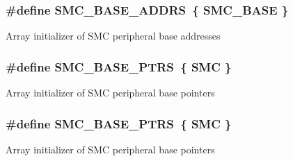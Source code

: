 \subsubsection[{\texorpdfstring{S\+M\+C\+\_\+\+B\+A\+S\+E\+\_\+\+A\+D\+D\+RS}{SMC_BASE_ADDRS}}]{\setlength{\rightskip}{0pt plus 5cm}\#define S\+M\+C\+\_\+\+B\+A\+S\+E\+\_\+\+A\+D\+D\+RS~\{ {\bf S\+M\+C\+\_\+\+B\+A\+SE} \}}\hypertarget{group__SMC__Peripheral__Access__Layer_ga1378b926401c2f7a44f4238a027ff8c2}{}\label{group__SMC__Peripheral__Access__Layer_ga1378b926401c2f7a44f4238a027ff8c2}
Array initializer of S\+MC peripheral base addresses 
\subsubsection[{\texorpdfstring{S\+M\+C\+\_\+\+B\+A\+S\+E\+\_\+\+P\+T\+RS}{SMC_BASE_PTRS}}]{\setlength{\rightskip}{0pt plus 5cm}\#define S\+M\+C\+\_\+\+B\+A\+S\+E\+\_\+\+P\+T\+RS~\{ {\bf S\+MC} \}}\hypertarget{group__SMC__Peripheral__Access__Layer_gae583f3f0917ee513adcac36dd042a5f3}{}\label{group__SMC__Peripheral__Access__Layer_gae583f3f0917ee513adcac36dd042a5f3}
Array initializer of S\+MC peripheral base pointers 
\subsubsection[{\texorpdfstring{S\+M\+C\+\_\+\+B\+A\+S\+E\+\_\+\+P\+T\+RS}{SMC_BASE_PTRS}}]{\setlength{\rightskip}{0pt plus 5cm}\#define S\+M\+C\+\_\+\+B\+A\+S\+E\+\_\+\+P\+T\+RS~\{ {\bf S\+MC} \}}\hypertarget{group__SMC__Peripheral__Access__Layer_gae583f3f0917ee513adcac36dd042a5f3}{}\label{group__SMC__Peripheral__Access__Layer_gae583f3f0917ee513adcac36dd042a5f3}
Array initializer of S\+MC peripheral base pointers 